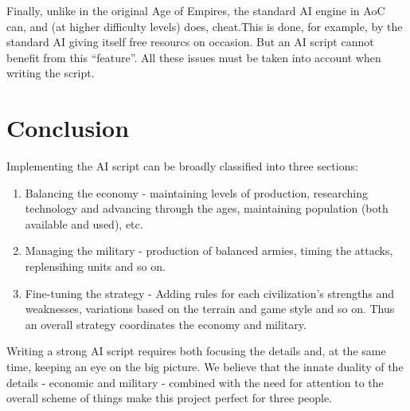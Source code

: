 \documentclass[a4paper,12pt]{article}
\begin{document}
Finally, unlike in the original Age of Empires, the standard AI engine in AoC can, 
and (at higher difficulty levels) does, cheat.\footnotemark[1] This is done, for 
example, by the standard AI giving itself free resourcs on occasion. But an AI 
script cannot benefit from this ``feature''. All these issues must be taken into 
account when writing the script.


\section*{Conclusion}
Implementing the AI script can be broadly classified into three sections:
\begin{enumerate}
	\item Balancing the economy - maintaining levels of production, researching technology 
		and advancing through the ages, maintaining population (both available and used), etc.
	\item Managing the military - production of balanced armies, timing the attacks, 
		replensihing units and so on.
	\item Fine-tuning the strategy - Adding rules for each civilization's strengths and 
		weaknesses, variations based on the terrain and game style and so on. 
		Thus an overall strategy coordinates the economy and military.
\end{enumerate}

Writing a strong AI script requires both focusing the details and, at the same time,
keeping an eye on the big picture. We believe that the innate duality of the details - 
economic and military - combined with the need for attention to the overall scheme of
things make this project perfect for three people.
\end{document}
